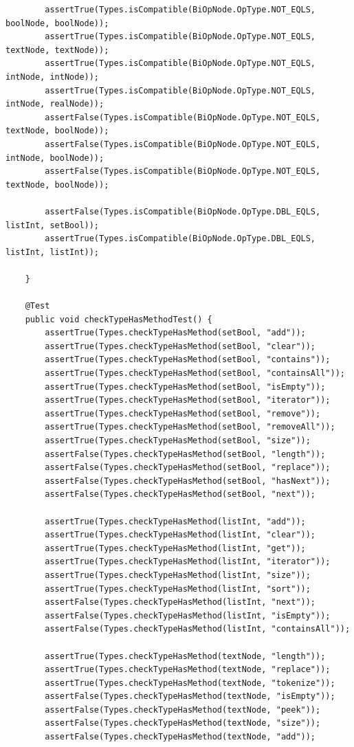 \documentclass{report}
\begin{document}
\begin{verbatim}
		assertTrue(Types.isCompatible(BiOpNode.OpType.NOT_EQLS, boolNode, boolNode));
		assertTrue(Types.isCompatible(BiOpNode.OpType.NOT_EQLS, textNode, textNode));
		assertTrue(Types.isCompatible(BiOpNode.OpType.NOT_EQLS, intNode, intNode));
		assertTrue(Types.isCompatible(BiOpNode.OpType.NOT_EQLS, intNode, realNode));
		assertFalse(Types.isCompatible(BiOpNode.OpType.NOT_EQLS, textNode, boolNode));
		assertFalse(Types.isCompatible(BiOpNode.OpType.NOT_EQLS, intNode, boolNode));
		assertFalse(Types.isCompatible(BiOpNode.OpType.NOT_EQLS, textNode, boolNode));
		
		assertFalse(Types.isCompatible(BiOpNode.OpType.DBL_EQLS, listInt, setBool));
		assertTrue(Types.isCompatible(BiOpNode.OpType.DBL_EQLS, listInt, listInt));

	}
	
	@Test
	public void checkTypeHasMethodTest() {		
		assertTrue(Types.checkTypeHasMethod(setBool, "add"));
		assertTrue(Types.checkTypeHasMethod(setBool, "clear"));
		assertTrue(Types.checkTypeHasMethod(setBool, "contains"));
		assertTrue(Types.checkTypeHasMethod(setBool, "containsAll"));
		assertTrue(Types.checkTypeHasMethod(setBool, "isEmpty"));
		assertTrue(Types.checkTypeHasMethod(setBool, "iterator"));
		assertTrue(Types.checkTypeHasMethod(setBool, "remove"));
		assertTrue(Types.checkTypeHasMethod(setBool, "removeAll"));
		assertTrue(Types.checkTypeHasMethod(setBool, "size"));
		assertFalse(Types.checkTypeHasMethod(setBool, "length"));
		assertFalse(Types.checkTypeHasMethod(setBool, "replace"));
		assertFalse(Types.checkTypeHasMethod(setBool, "hasNext"));
		assertFalse(Types.checkTypeHasMethod(setBool, "next"));
		
		assertTrue(Types.checkTypeHasMethod(listInt, "add"));
		assertTrue(Types.checkTypeHasMethod(listInt, "clear"));
		assertTrue(Types.checkTypeHasMethod(listInt, "get"));
		assertTrue(Types.checkTypeHasMethod(listInt, "iterator"));
		assertTrue(Types.checkTypeHasMethod(listInt, "size"));
		assertTrue(Types.checkTypeHasMethod(listInt, "sort"));
		assertFalse(Types.checkTypeHasMethod(listInt, "next"));
		assertFalse(Types.checkTypeHasMethod(listInt, "isEmpty"));
		assertFalse(Types.checkTypeHasMethod(listInt, "containsAll"));
		
		assertTrue(Types.checkTypeHasMethod(textNode, "length"));
		assertTrue(Types.checkTypeHasMethod(textNode, "replace"));
		assertTrue(Types.checkTypeHasMethod(textNode, "tokenize"));
		assertFalse(Types.checkTypeHasMethod(textNode, "isEmpty"));
		assertFalse(Types.checkTypeHasMethod(textNode, "peek"));
		assertFalse(Types.checkTypeHasMethod(textNode, "size"));
		assertFalse(Types.checkTypeHasMethod(textNode, "add"));
		

\end{verbatim}
\end{document}
